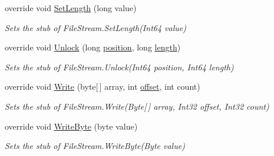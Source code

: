 \begin{DoxyCompactItemize}
override void \hyperlink{class_system_1_1_i_o_1_1_fakes_1_1_stub_file_stream_ac2d8987fe98fe99c806b114f8161f496}{Set\-Length} (long value)
\begin{DoxyCompactList}\small\item\em Sets the stub of File\-Stream.\-Set\-Length(\-Int64 value)\end{DoxyCompactList}\item 
override void \hyperlink{class_system_1_1_i_o_1_1_fakes_1_1_stub_file_stream_a6a4c44d45183aabe2371208ac0bf298f}{Unlock} (long \hyperlink{jquery-1_810_82-vsdoc_8js_a0a2a38b3281bb5c9cf0c479a04b513cb}{position}, long \hyperlink{jquery-1_810_82-vsdoc_8js_aa7de35d58da66d9944ab9cbe82c19640}{length})
\begin{DoxyCompactList}\small\item\em Sets the stub of File\-Stream.\-Unlock(\-Int64 position, Int64 length)\end{DoxyCompactList}\item 
override void \hyperlink{class_system_1_1_i_o_1_1_fakes_1_1_stub_file_stream_a85cfe41df12d561ea2035ddd40026528}{Write} (byte\mbox{[}$\,$\mbox{]} array, int \hyperlink{jquery-1_810_82_8js_a4a9f594d20d927164551fc7fa4751a2f}{offset}, int count)
\begin{DoxyCompactList}\small\item\em Sets the stub of File\-Stream.\-Write(\-Byte\mbox{[}$\,$\mbox{]} array, Int32 offset, Int32 count)\end{DoxyCompactList}\item 
override void \hyperlink{class_system_1_1_i_o_1_1_fakes_1_1_stub_file_stream_a1fdebc473d75ba820f9cae99823d7058}{Write\-Byte} (byte value)
\begin{DoxyCompactList}\small\item\em Sets the stub of File\-Stream.\-Write\-Byte(\-Byte value)\end{DoxyCompactList}\end{DoxyCompactItemize}
